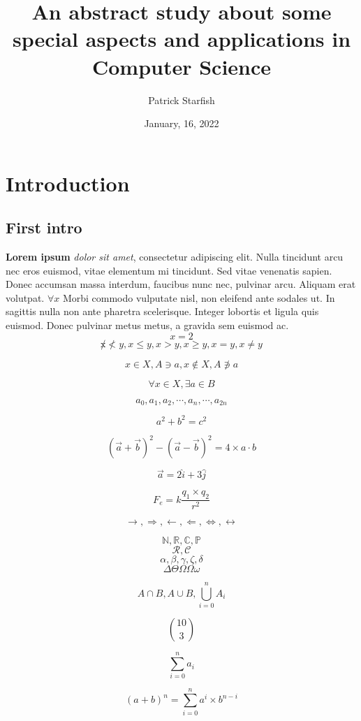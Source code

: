 \documentclass[a4paper, 12pt]{article}
\title{An abstract study about some special aspects and applications in Computer Science}
\author{Patrick Starfish}
\date{January, 16, 2022}
\begin{document}
	\maketitle
	\tableofcontents\newpage
	\section{Introduction}
	\subsection{First intro}
	\textbf{Lorem ipsum} \textit{dolor sit amet}, consectetur adipiscing elit. Nulla tincidunt arcu nec eros euismod, vitae elementum mi tincidunt. Sed vitae venenatis sapien. Donec accumsan massa interdum, faucibus nunc nec, pulvinar arcu. Aliquam erat volutpat. $\forall x $ Morbi commodo vulputate nisl, non eleifend ante sodales ut. In sagittis nulla non ante pharetra scelerisque. Integer lobortis et ligula quis euismod. Donec pulvinar metus metus, a gravida sem euismod ac.$$ x = 2 $$
	$$\not x \not< y, x \leq y, x > y, x \geq y , x = y, x \not= y$$
	
	$$x \in X, A \ni a, x \not\in X, A \not\ni a$$
	
	$$\forall x \in X, \exists a \in B$$
	
	$$a_0, a_1, a_2, \cdots, a_n, \cdots, a_{2n}$$
	
	$$a^2 + b^2 = c^2$$
	
	$$(\vec{a} + \vec{b})^2 - (\vec{a} - \vec{b})^2 = 4 \times a\cdot b$$
	
	$$\vec{a} = 2\hat{i} + 3\hat{j}$$
	
	$$F_e = k \frac{q_1 \times q_2}{r^2}$$
	
	$$ \rightarrow , \Rightarrow , \leftarrow, \Leftarrow, \Leftrightarrow, \leftrightarrow$$
	
	$$\mathbb{N} , \mathbb{R}, \mathbb{C}, \mathbb{P}$$
	$$\mathcal{R}, \mathcal{C}$$
	$$\alpha, \beta, \gamma, \zeta ,\delta $$
	$$\Delta \Theta \Omega\varOmega\omega $$
	
	$$A \cap B, A \cup B, \bigcup_{i=0}^{n} A_i$$
	
	$$\binom{10}{3}$$
	
	$$\sum_{i=0}^n a_i$$
	
	$$(a + b)^n = \sum_{i=0}^{n} a^i \times b^{n - i}$$
	
\end{document}
